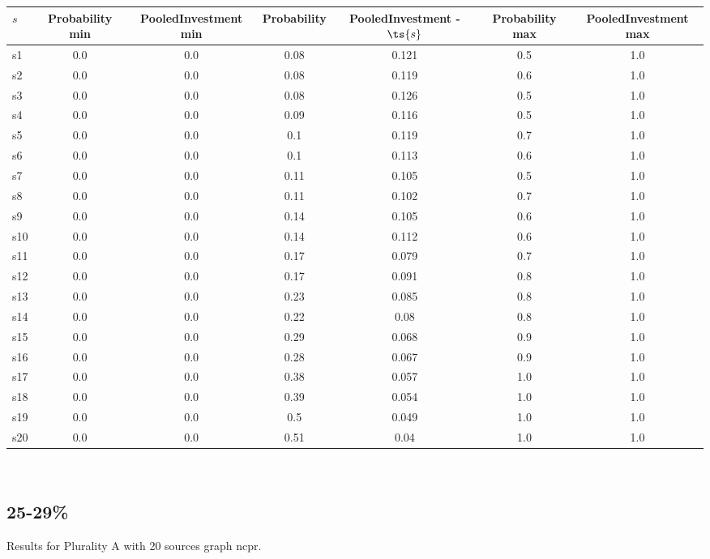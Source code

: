 \documentclass{article}
\begin{document}
\noindent\begin{tabular}{|l|c|c|c|c|c|c|}
\hline
$s$& Probability min & PooledInvestment min & Probability & PooledInvestment - $\ts{s}$ & Probability max & PooledInvestment max\\
\hline
s1 &0.0 & 0.0 & 0.08 & 0.121 & 0.5 & 1.0\\
\hline
s2 &0.0 & 0.0 & 0.08 & 0.119 & 0.6 & 1.0\\
\hline
s3 &0.0 & 0.0 & 0.08 & 0.126 & 0.5 & 1.0\\
\hline
s4 &0.0 & 0.0 & 0.09 & 0.116 & 0.5 & 1.0\\
\hline
s5 &0.0 & 0.0 & 0.1 & 0.119 & 0.7 & 1.0\\
\hline
s6 &0.0 & 0.0 & 0.1 & 0.113 & 0.6 & 1.0\\
\hline
s7 &0.0 & 0.0 & 0.11 & 0.105 & 0.5 & 1.0\\
\hline
s8 &0.0 & 0.0 & 0.11 & 0.102 & 0.7 & 1.0\\
\hline
s9 &0.0 & 0.0 & 0.14 & 0.105 & 0.6 & 1.0\\
\hline
s10 &0.0 & 0.0 & 0.14 & 0.112 & 0.6 & 1.0\\
\hline
s11 &0.0 & 0.0 & 0.17 & 0.079 & 0.7 & 1.0\\
\hline
s12 &0.0 & 0.0 & 0.17 & 0.091 & 0.8 & 1.0\\
\hline
s13 &0.0 & 0.0 & 0.23 & 0.085 & 0.8 & 1.0\\
\hline
s14 &0.0 & 0.0 & 0.22 & 0.08 & 0.8 & 1.0\\
\hline
s15 &0.0 & 0.0 & 0.29 & 0.068 & 0.9 & 1.0\\
\hline
s16 &0.0 & 0.0 & 0.28 & 0.067 & 0.9 & 1.0\\
\hline
s17 &0.0 & 0.0 & 0.38 & 0.057 & 1.0 & 1.0\\
\hline
s18 &0.0 & 0.0 & 0.39 & 0.054 & 1.0 & 1.0\\
\hline
s19 &0.0 & 0.0 & 0.5 & 0.049 & 1.0 & 1.0\\
\hline
s20 &0.0 & 0.0 & 0.51 & 0.04 & 1.0 & 1.0\\
\hline
\end{tabular}\\

\newpage

\subsection{25-29\%}

\noindent Results for Plurality A with 20 sources graph ncpr.
\end{document}
